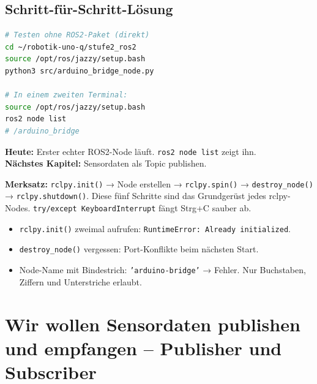 \section{Schritt-für-Schritt-Lösung}

\begin{loesungBox}
\begin{lstlisting}[language=bash]
# Testen ohne ROS2-Paket (direkt)
cd ~/robotik-uno-q/stufe2_ros2
source /opt/ros/jazzy/setup.bash
python3 src/arduino_bridge_node.py

# In einem zweiten Terminal:
source /opt/ros/jazzy/setup.bash
ros2 node list
# /arduino_bridge
\end{lstlisting}
\end{loesungBox}

\begin{projektBox}
\textbf{Heute:} Erster echter ROS2-Node läuft. \texttt{ros2 node list} zeigt ihn.\\
\textbf{Nächstes Kapitel:} Sensordaten als Topic publishen.
\end{projektBox}

\begin{merksatzBox}
\textbf{Merksatz:}
\texttt{rclpy.init()} → Node erstellen → \texttt{rclpy.spin()} → \texttt{destroy\_node()} → \texttt{rclpy.shutdown()}.
Diese fünf Schritte sind das Grundgerüst jedes rclpy-Nodes.
\texttt{try/except KeyboardInterrupt} fängt Strg+C sauber ab.
\end{merksatzBox}

\begin{fehlerBox}
\begin{itemize}
\item \texttt{rclpy.init()} zweimal aufrufen: \texttt{RuntimeError: Already initialized}.
\item \texttt{destroy\_node()} vergessen: Port-Konflikte beim nächsten Start.
\item Node-Name mit Bindestrich: \texttt{'arduino-bridge'} → Fehler.
  Nur Buchstaben, Ziffern und Unterstriche erlaubt.
\end{itemize}
\end{fehlerBox}


\chapter{Wir wollen Sensordaten publishen und empfangen –
  Publisher und Subscriber}

